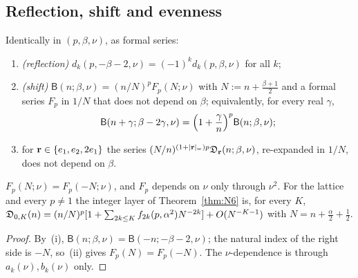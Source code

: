 \subsection{Reflection, shift and evenness}\label{sec:shift-thm}
\begin{theorem}\label{thm:shift}
Identically in $(p,\beta,\nu)$, as formal series:
\begin{enumerate}
\item[(i)] \emph{(reflection)} $d_k(p,-\beta-2,\nu)=(-1)^kd_k(p,\beta,\nu)$ for all $k$;
\item[(ii)] \emph{(shift)} $\mathsf B(n;\beta,\nu)=(n/N)^pF_p(N;\nu)$ with $N:=n+\frac{\beta+1}2$ and a formal series $F_p$ in $1/N$ that does not depend on
$\beta$; equivalently, for every real $\gamma$,
\begin{equation}\label{eq:FI}
  \mathsf B(n+\gamma;\beta-2\gamma,\nu)=\Bigl(1+\frac\gamma n\Bigr)^p\mathsf B(n;\beta,\nu);
\end{equation}
\item[(iii)] for $\mathbf r\in\{e_1,e_2,2e_1\}$ the series $(N/n)^{(1+|\mathbf r|_w)p}\mathfrak D_{\mathbf r}(n;\beta,\nu)$, re-expanded in $1/N$, does not depend on $\beta$.
\end{enumerate}
\end{theorem}

\begin{corollary}[evenness]\label{cor:even}
$F_p(N;\nu)=F_p(-N;\nu)$, and $F_p$ depends on $\nu$ only through $\nu^2$. For the lattice and every $p\ne1$ the integer layer of
Theorem~\ref{thm:N6} is, for every $K$, $\mathfrak D_{0,K}(n)=(n/N)^p[1+\sum_{2k\le K}f_{2k}(p,\alpha^2)N^{-2k}]+O(N^{-K-1})$ with $N=n+\frac\alpha2+\frac12$.
\end{corollary}

\begin{proof}
By~(i), $\mathsf B(n;\beta,\nu)=\mathsf B(-n;-\beta-2,\nu)$; the natural index of the right side is $-N$, so~(ii) gives $F_p(N)=F_p(-N)$. The $\nu$-dependence is
through $a_k(\nu),b_k(\nu)$ only.
\end{proof}


